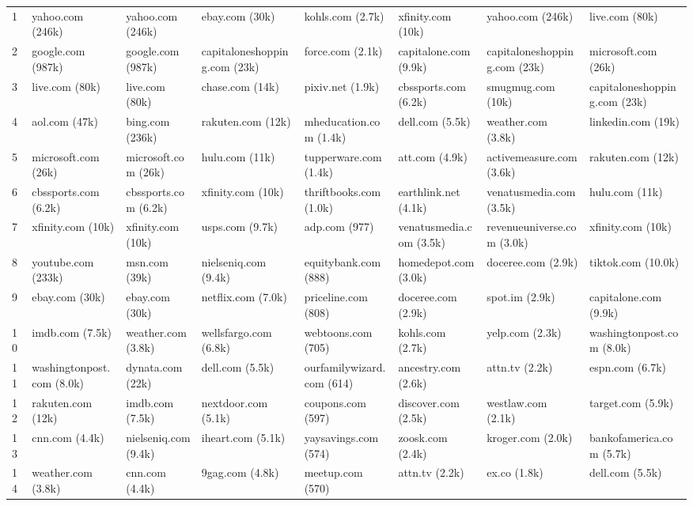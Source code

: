 \documentclass[12pt, letterpaper]{article}
\begin{document}
\begin{table}[ht]
\begin{adjustbox}{max width=\textwidth}
\begin{tabular}{@{\hspace{0\tabcolsep}}llllllll@{\hspace{0\tabcolsep}}}
1 & yahoo.com (246k) & yahoo.com (246k) & ebay.com (30k) & kohls.com (2.7k) & xfinity.com (10k) & yahoo.com (246k) & live.com (80k) \\
2 & google.com (987k) & google.com (987k) & capitaloneshopping.com (23k) & force.com (2.1k) & capitalone.com (9.9k) & capitaloneshopping.com (23k) & microsoft.com (26k) \\
3 & live.com (80k) & live.com (80k) & chase.com (14k) & pixiv.net (1.9k) & cbssports.com (6.2k) & smugmug.com (10k) & capitaloneshopping.com (23k) \\
4 & aol.com (47k) & bing.com (236k) & rakuten.com (12k) & mheducation.com (1.4k) & dell.com (5.5k) & weather.com (3.8k) & linkedin.com (19k) \\
5 & microsoft.com (26k) & microsoft.com (26k) & hulu.com (11k) & tupperware.com (1.4k) & att.com (4.9k) & activemeasure.com (3.6k) & rakuten.com (12k) \\
6 & cbssports.com (6.2k) & cbssports.com (6.2k) & xfinity.com (10k) & thriftbooks.com (1.0k) & earthlink.net (4.1k) & venatusmedia.com (3.5k) & hulu.com (11k) \\
7 & xfinity.com (10k) & xfinity.com (10k) & usps.com (9.7k) & adp.com (977) & venatusmedia.com (3.5k) & revenueuniverse.com (3.0k) & xfinity.com (10k) \\
8 & youtube.com (233k) & msn.com (39k) & nielseniq.com (9.4k) & equitybank.com (888) & homedepot.com (3.0k) & doceree.com (2.9k) & tiktok.com (10.0k) \\
9 & ebay.com (30k) & ebay.com (30k) & netflix.com (7.0k) & priceline.com (808) & doceree.com (2.9k) & spot.im (2.9k) & capitalone.com (9.9k) \\
10 & imdb.com (7.5k) & weather.com (3.8k) & wellsfargo.com (6.8k) & webtoons.com (705) & kohls.com (2.7k) & yelp.com (2.3k) & washingtonpost.com (8.0k) \\
11 & washingtonpost.com (8.0k) & dynata.com (22k) & dell.com (5.5k) & ourfamilywizard.com (614) & ancestry.com (2.6k) & attn.tv (2.2k) & espn.com (6.7k) \\
12 & rakuten.com (12k) & imdb.com (7.5k) & nextdoor.com (5.1k) & coupons.com (597) & discover.com (2.5k) & westlaw.com (2.1k) & target.com (5.9k) \\
13 & cnn.com (4.4k) & nielseniq.com (9.4k) & iheart.com (5.1k) & yaysavings.com (574) & zoosk.com (2.4k) & kroger.com (2.0k) & bankofamerica.com (5.7k) \\
14 & weather.com (3.8k) & cnn.com (4.4k) & 9gag.com (4.8k) & meetup.com (570) & attn.tv (2.2k) & ex.co (1.8k) & dell.com (5.5k) \\

\end{tabular}
\end{adjustbox}
\end{table}
\end{document}
